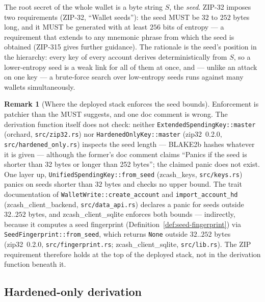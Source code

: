 \documentclass[11pt,a4paper]{article}
\theoremstyle{definition}
\newtheorem{remark}[theorem]{Remark}
\begin{document}
The root secret of the whole wallet is a byte string $S$, the \emph{seed}.
ZIP-32 imposes two requirements (ZIP-32, ``Wallet seeds''): the seed MUST be
$32$ to $252$ bytes long, and it MUST be generated with at least $256$ bits
of entropy --- a requirement that extends to any mnemonic phrase from which
the seed is obtained (ZIP-315 gives further guidance). The rationale is the
seed's position in the hierarchy: every key of every account derives
deterministically from $S$, so a lower-entropy seed is a weak link for all
of them at once, and --- unlike an attack on one key --- a brute-force
search over low-entropy seeds runs against many wallets simultaneously.

\begin{remark}[Where the deployed stack enforces the seed bounds]
Enforcement is patchier than the MUST suggests, and one doc comment is
wrong. The derivation function itself does not check: neither
\texttt{ExtendedSpendingKey::master} (\textsf{orchard},
\texttt{src/zip32.rs}) nor \texttt{HardenedOnlyKey::master}
(\textsf{zip32}~0.2.0, \texttt{src/hardened\_only.rs}) inspects the seed
length --- BLAKE2b hashes whatever it is given --- although the former's doc
comment claims ``Panics if the seed is shorter than 32 bytes or longer than
252 bytes''; the claimed panic does not exist. One layer up,
\texttt{UnifiedSpendingKey::from\_seed} (\textsf{zcash\_keys},
\texttt{src/keys.rs}) panics on seeds shorter than $32$ bytes and checks no
upper bound. The trait documentation of \texttt{WalletWrite::create\_account}
and \texttt{import\_account\_hd} (\textsf{zcash\_client\_backend},
\texttt{src/data\_api.rs}) declares a panic for seeds outside $32..252$
bytes, and \textsf{zcash\_client\_sqlite} enforces both bounds ---
indirectly, because it computes a seed fingerprint
(Definition~\ref{def:seed-fingerprint}) via
\texttt{SeedFingerprint::from\_seed}, which returns \texttt{None} outside
$32..252$ bytes (\textsf{zip32}~0.2.0, \texttt{src/fingerprint.rs};
\textsf{zcash\_client\_sqlite}, \texttt{src/lib.rs}). The ZIP requirement
therefore holds at the top of the deployed stack, not in the derivation
function beneath it.
\end{remark}

\subsection{Hardened-only derivation}\label{sec:zip32-hardened}
\end{document}

